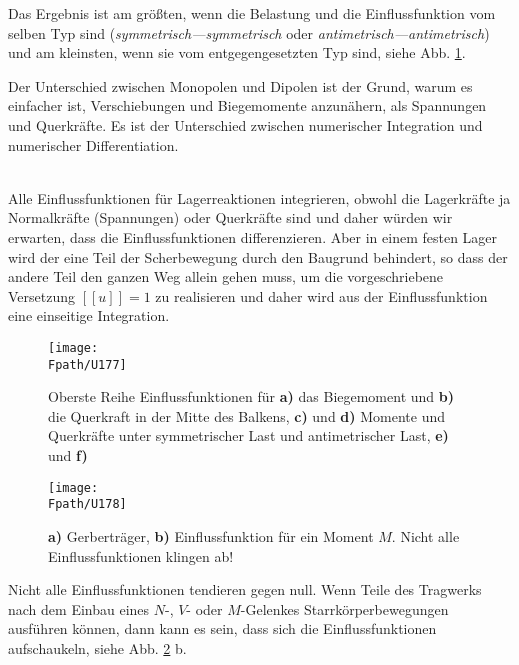 Das Ergebnis ist am gr\"{o}{\ss}ten, wenn die Belastung und die Einflussfunktion vom selben Typ sind ({\em symmetrisch---symmetrisch\/} oder {\em anti\-metrisch---anti\-metrisch\/}) und am kleinsten, wenn sie vom entgegengesetzten Typ sind, siehe Abb. \ref{U177}.\\

\hspace*{-12pt}\colorbox{highlightBlue}{\parbox{0.98\textwidth}{ Der Unterschied zwischen Monopolen und Dipolen ist der Grund, warum es einfacher ist, Verschiebungen und Biegemomente anzun\"{a}hern, als Spannungen und Querkr\"{a}fte. Es ist der Unterschied zwischen  numerischer Integration und numerischer Differentiation.}}\\

Alle Einflussfunktionen f\"{u}r Lagerreaktionen integrieren, obwohl die Lagerkr\"{a}fte ja Normalkr\"{a}fte (Spannungen) oder Querkr\"{a}fte sind und daher w\"{u}rden wir erwarten, dass die Einflussfunktionen differenzieren. Aber in einem festen Lager wird der eine Teil der Scherbewegung durch den Baugrund behindert, so dass der andere Teil den ganzen Weg allein gehen muss, um die vorgeschriebene Versetzung $[[u]] = 1$ zu realisieren und daher wird aus der Einflussfunktion eine einseitige Integration.


\begin{figure}[tbp]
\centering
\texttt{[image: \\Fpath/U177]}
\caption{Oberste Reihe Einflussfunktionen f\"{u}r \textbf{ a)} das Biegemoment und \textbf{ b)} die Querkraft in der Mitte des Balkens, \textbf{ c)} und \textbf{ d)} Momente und Querkr\"{a}fte unter symmetrischer Last und antimetrischer Last, \textbf{ e)} und \textbf{ f)}}
\label{U177}%
%
\end{figure}%
\begin{figure}[tbp]
\centering
\texttt{[image: \\Fpath/U178]}
\caption{\textbf{ a)} Gerbertr\"{a}ger, \textbf{ b)} Einflussfunktion f\"{u}r ein Moment $M$. Nicht alle Einflussfunktionen klingen ab! }
\label{U178}%
%
\end{figure}%

Nicht alle Einflussfunktionen tendieren gegen null. Wenn Teile des Tragwerks nach dem Einbau eines $N$-, $V$- oder $M$-Gelenkes Starrk\"{o}rperbewegungen ausf\"{u}hren k\"{o}nnen, dann kann es sein, dass sich die Einflussfunktionen aufschaukeln, siehe Abb. \ref{U178} b.

